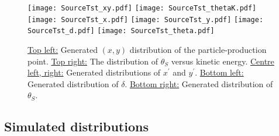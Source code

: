 \begin{figure}
  \begin{center}
    \texttt{[image: SourceTst\_xy.pdf]}
    \texttt{[image: SourceTst\_thetaK.pdf]}
    \texttt{[image: SourceTst\_x.pdf]}
    \texttt{[image: SourceTst\_y.pdf]}
    \texttt{[image: SourceTst\_d.pdf]}
    \texttt{[image: SourceTst\_theta.pdf]}
  \end{center}
  \caption{
    \underline{Top left:} Generated $(x, y)$ distribution of the
    particle-production point.
    \underline{Top right:} The distribution of $\theta_S$ versus
    kinetic energy.
    \underline{Centre left, right:} Generated distributions of
    $x^\prime$ and $y^\prime$.
    \underline{Bottom left:} Generated distribution of $\delta$.
    \underline{Bottom right:} Generated distribution of $\theta_S$.
  }
  \label{Fig:LsrDrvSrc:Dists}
\end{figure}

\subsection{Simulated distributions}

